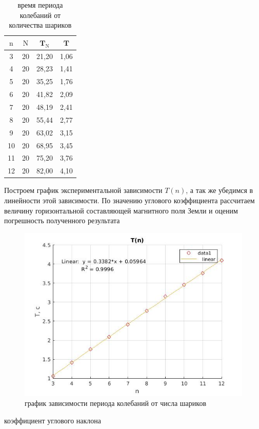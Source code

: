 \documentclass[a4paper, 12pt]{article}%
\begin{document}
\newpage

\begin{table}[!h]
\begin{center}
\begin{tabular}{|c|c|c|c|}
\hline $\mathrm{n}$ & $\mathrm{N}$ & $\mathbf{T}_{\mathrm{N}}$ & $\mathbf{T}$ \\
\hline 3 & 20 & 21,20 & 1,06 \\
\hline 4 & 20 & 28,23 & 1,41 \\
\hline 5 & 20 & 35,25 & 1,76 \\
\hline 6 & 20 & 41,82 & 2,09 \\
\hline 7 & 20 & 48,19 & 2,41 \\
\hline 8 & 20 & 55,44 & 2,77 \\
\hline 9 & 20 & 63,02 & 3,15 \\
\hline 10 & 20 & 68,95 & 3,45 \\
\hline 11 & 20 & 75,20 & 3,76 \\
\hline 12 & 20 & 82,00 & 4,10 \\
\hline
\end{tabular}
\caption{время периода колебаний от количества шариков}
\end{center}
\end{table}

Построем график экспериментальной зависимости $T(n)$, а так же убедимся в линейности этой зависимости. По значению углового коэффициента рассчитаем величину горизонтальной составляющей магнитного поля Земли и оценим погрешность полученного результата


\begin{figure}[h]
    \centering
    \includegraphics[width = 9 cm]{graph1_s.jpg}
    \caption{график зависимости периода колебаний от числа шариков}
    \label{msh1}
\end{figure}

коэффициент углового наклона 
\end{document}
